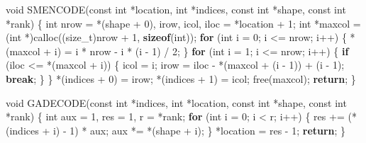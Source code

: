 \documentclass[
  12pt,
]{article}
\newenvironment{Shaded}{\begin{snugshade}}{\end{snugshade}}
\newcommand{\ControlFlowTok}[1]{\textcolor[rgb]{0.13,0.29,0.53}{\textbf{#1}}}
\newcommand{\DataTypeTok}[1]{\textcolor[rgb]{0.13,0.29,0.53}{#1}}
\newcommand{\DecValTok}[1]{\textcolor[rgb]{0.00,0.00,0.81}{#1}}
\newcommand{\KeywordTok}[1]{\textcolor[rgb]{0.13,0.29,0.53}{\textbf{#1}}}
\newcommand{\NormalTok}[1]{#1}
\begin{document}
\begin{Shaded}
\begin{Highlighting}[]
\DataTypeTok{void}\NormalTok{ SMENCODE(}\DataTypeTok{const} \DataTypeTok{int}\NormalTok{ *location, }\DataTypeTok{int}\NormalTok{ *indices, }\DataTypeTok{const} \DataTypeTok{int}\NormalTok{ *shape,}
              \DataTypeTok{const} \DataTypeTok{int}\NormalTok{ *rank) \{}
  \DataTypeTok{int}\NormalTok{ nrow = *(shape + }\DecValTok{0}\NormalTok{), irow, icol, iloc = *location + }\DecValTok{1}\NormalTok{;}
  \DataTypeTok{int}\NormalTok{ *maxcol = (}\DataTypeTok{int}\NormalTok{ *)calloc((}\DataTypeTok{size\_t}\NormalTok{)nrow + }\DecValTok{1}\NormalTok{, }\KeywordTok{sizeof}\NormalTok{(}\DataTypeTok{int}\NormalTok{));}
  \ControlFlowTok{for}\NormalTok{ (}\DataTypeTok{int}\NormalTok{ i = }\DecValTok{0}\NormalTok{; i \textless{}= nrow; i++) \{}
\NormalTok{    *(maxcol + i) = i * nrow {-} i * (i {-} }\DecValTok{1}\NormalTok{) / }\DecValTok{2}\NormalTok{;}
\NormalTok{  \}}
  \ControlFlowTok{for}\NormalTok{ (}\DataTypeTok{int}\NormalTok{ i = }\DecValTok{1}\NormalTok{; i \textless{}= nrow; i++) \{}
    \ControlFlowTok{if}\NormalTok{ (iloc \textless{}= *(maxcol + i)) \{}
\NormalTok{      icol = i;}
\NormalTok{      irow = iloc {-} *(maxcol + (i {-} }\DecValTok{1}\NormalTok{)) + (i {-} }\DecValTok{1}\NormalTok{);}
      \ControlFlowTok{break}\NormalTok{;}
\NormalTok{    \}}
\NormalTok{  \}}
\NormalTok{  *(indices + }\DecValTok{0}\NormalTok{) = irow;}
\NormalTok{  *(indices + }\DecValTok{1}\NormalTok{) = icol;}
\NormalTok{  free(maxcol);}
  \ControlFlowTok{return}\NormalTok{;}
\NormalTok{\}}

\DataTypeTok{void}\NormalTok{ GADECODE(}\DataTypeTok{const} \DataTypeTok{int}\NormalTok{ *indices, }\DataTypeTok{int}\NormalTok{ *location, }\DataTypeTok{const} \DataTypeTok{int}\NormalTok{ *shape,}
              \DataTypeTok{const} \DataTypeTok{int}\NormalTok{ *rank) \{}
  \DataTypeTok{int}\NormalTok{ aux = }\DecValTok{1}\NormalTok{, res = }\DecValTok{1}\NormalTok{, r = *rank;}
  \ControlFlowTok{for}\NormalTok{ (}\DataTypeTok{int}\NormalTok{ i = }\DecValTok{0}\NormalTok{; i \textless{} r; i++) \{}
\NormalTok{    res += (*(indices + i) {-} }\DecValTok{1}\NormalTok{) * aux;}
\NormalTok{    aux *= *(shape + i);}
\NormalTok{  \}}
\NormalTok{  *location = res {-} }\DecValTok{1}\NormalTok{;}
  \ControlFlowTok{return}\NormalTok{;}
\NormalTok{\}}


\end{Highlighting}
\end{Shaded}
\end{document}
